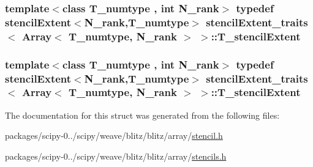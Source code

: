 \subsubsection[{T\+\_\+stencil\+Extent}]{\setlength{\rightskip}{0pt plus 5cm}template$<$class T\+\_\+numtype , int N\+\_\+rank$>$ typedef {\bf stencil\+Extent}$<$N\+\_\+rank,T\+\_\+numtype$>$ {\bf stencil\+Extent\+\_\+traits}$<$ {\bf Array}$<$ T\+\_\+numtype, N\+\_\+rank $>$ $>$\+::{\bf T\+\_\+stencil\+Extent}}\label{structstencilExtent__traits_3_01Array_3_01T__numtype_00_01N__rank_01_4_01_4_a2005d344fd8234669ceae1fe096e1b27}
\hypertarget{structstencilExtent__traits_3_01Array_3_01T__numtype_00_01N__rank_01_4_01_4_a2005d344fd8234669ceae1fe096e1b27}{}
\subsubsection[{T\+\_\+stencil\+Extent}]{\setlength{\rightskip}{0pt plus 5cm}template$<$class T\+\_\+numtype , int N\+\_\+rank$>$ typedef {\bf stencil\+Extent}$<$N\+\_\+rank,T\+\_\+numtype$>$ {\bf stencil\+Extent\+\_\+traits}$<$ {\bf Array}$<$ T\+\_\+numtype, N\+\_\+rank $>$ $>$\+::{\bf T\+\_\+stencil\+Extent}}\label{structstencilExtent__traits_3_01Array_3_01T__numtype_00_01N__rank_01_4_01_4_a2005d344fd8234669ceae1fe096e1b27}


The documentation for this struct was generated from the following files\+:\begin{DoxyCompactItemize}
\item 
packages/scipy-\/0../scipy/weave/blitz/blitz/array/\hyperlink{stencil_8h}{stencil.\+h}\item 
packages/scipy-\/0../scipy/weave/blitz/blitz/array/\hyperlink{stencils_8h}{stencils.\+h}\end{DoxyCompactItemize}
